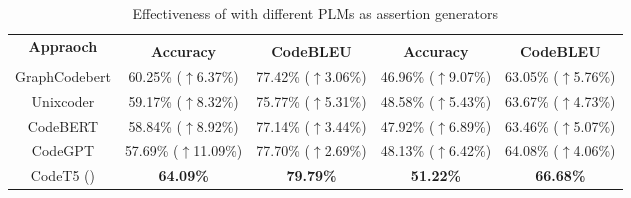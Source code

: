 \begin{table*}[t]
\footnotesize
    \centering
    \caption{Effectiveness of {\toolname} with different PLMs as assertion generators}
    \begin{tabular}{c|cc|c|c}
    \toprule
    \multirow{2}[4]{*}{\textbf{Appraoch}} & \multicolumn{2}{c|}{\olddata{}} & \multicolumn{2}{c}{\newdata{}} \\
\cmidrule{2-5}          & \textbf{Accuracy} & \textbf{CodeBLEU} & \multicolumn{1}{c}{\textbf{Accuracy}} & \textbf{CodeBLEU} \\
    \midrule
    GraphCodebert  & 60.25\% ($\uparrow$6.37\%) & 77.42\% ($\uparrow$3.06\%) & 46.96\% ($\uparrow$9.07\%) & 63.05\% ($\uparrow$5.76\%) \\
    Unixcoder  & 59.17\% ($\uparrow$8.32\%) & 75.77\% ($\uparrow$5.31\%) & 48.58\% ($\uparrow$5.43\%) & 63.67\% ($\uparrow$4.73\%) \\
    CodeBERT  & 58.84\% ($\uparrow$8.92\%) & 77.14\% ($\uparrow$3.44\%) & 47.92\% ($\uparrow$6.89\%) & 63.46\% ($\uparrow$5.07\%) \\
    CodeGPT & 57.69\% ($\uparrow$11.09\%) & 77.70\% ($\uparrow$2.69\%) & 48.13\% ($\uparrow$6.42\%) & 64.08\% ($\uparrow$4.06\%) \\
    \midrule
    CodeT5 (\toolname{}) & \textbf{64.09\%} & \textbf{79.79\%} & \textbf{51.22\%} & \textbf{66.68\%} \\
    \bottomrule
    \end{tabular}
    \label{tab:rq3}
\end{table*}

